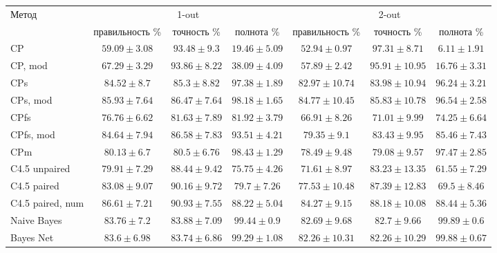 	\begin{sidewaystable}[ph!]
		\centering
		\begin{tabular}{|l|ccc|ccc|}
			\hline
			\multirow{2}{*}{Метод}   & \multicolumn{3}{c|}{1-out}                             & \multicolumn{3}{c|}{2-out}         \\ \cline{2-7}  
									 & правильность \%  & точность \%      & полнота \%       & правильность \%   & точность \%       & полнота \% \rule{0pt}{2.4ex} \\ \hline
			CP 						 & $59.09 \pm 3.08$ & $93.48 \pm 9.3$  & $19.46 \pm 5.09$ & $52.94 \pm 0.97$  & $97.31 \pm 8.71$  & $6.11 \pm 1.91$ \rule{0pt}{2.4ex} \\ 
			CP, mod					 & $67.29 \pm 3.29$ & $93.86 \pm 8.22$ & $38.09 \pm 4.09$ & $57.89 \pm 2.42$ & $95.91 \pm 10.95$ & $16.76 \pm 3.31$ \\ 
			CPs 					 & $84.52 \pm 8.7$  & $85.3 \pm 8.82$  & $97.38 \pm 1.89$ & $82.97 \pm 10.74$ & $83.98 \pm 10.94$ & $96.24 \pm 3.21$ \\
			CPs, mod				 & $85.93 \pm 7.64$ & $86.47 \pm 7.64$ & $98.18 \pm 1.65$ & $84.77 \pm 10.45$ & $85.83 \pm 10.78$ & $96.54 \pm 2.58$ \\
			CPfs					 & $76.76 \pm 6.62$ & $81.63 \pm 7.89$ & $81.92 \pm 3.79$ & $66.91 \pm 8.26$  & $71.01 \pm 9.99$  & $74.25 \pm 6.64$ \\
			CPfs, mod				 & $84.64 \pm 7.94$ & $86.58 \pm 7.83$ & $93.51 \pm 4.21$ & $79.35 \pm 9.1$  & $83.43 \pm 9.95$  & $85.46 \pm 7.43$ \\ 
			CPm						 & $80.13 \pm 6.7$  & $80.5 \pm 6.76 $ & $98.43 \pm 1.29$ & $78.49 \pm 9.48$  & $79.08 \pm 9.57$  & $97.47 \pm 2.85$ \\ 
			C4.5 unpaired			 & $79.91 \pm 7.29$ & $88.44 \pm 9.42$ & $75.75 \pm 4.26$ & $71.61 \pm 8.97$  & $83.23 \pm 13.35$ & $61.55 \pm 7.29$ \\ 
			C4.5 paired  			 & $83.08 \pm 9.07$ & $90.16 \pm 9.72$ & $79.7 \pm 7.26$  & $77.53 \pm 10.48$ & $87.39 \pm 12.83$ & $69.5 \pm 8.46$ \\ 
			C4.5 paired, num 	     & $86.61 \pm 7.21$ & $90.93 \pm 7.55$ & $88.22 \pm 5.04$ & $84.27 \pm 9.15$  & $88.18 \pm 10.08$ & $88.44 \pm 5.36$ \\
			Naive Bayes  			 & $83.76 \pm 7.2$  & $83.88 \pm 7.09$ & $99.44 \pm 0.9$  & $82.69 \pm 9.68$  & $82.7 \pm 9.66$   & $99.89 \pm 0.6$ \\ 
			Bayes Net  				 & $83.6 \pm 6.98$  & $83.74 \pm 6.86$ & $99.29 \pm 1.08$ & $82.26 \pm 10.31$ & $82.26 \pm 10.29$ & $99.88 \pm 0.67$ \\ 
			\hline
		\end{tabular}
		\label{tbl:cars_results}
		

\end{sidewaystable}

